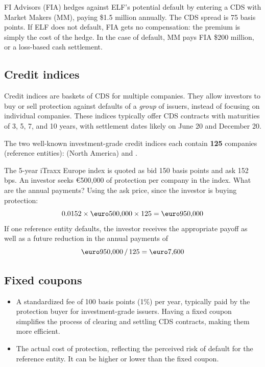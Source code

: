 \begin{crexbox}
FI Advisors (FIA) hedges against ELF's potential default by entering a CDS with
Market Makers (MM), paying \$1.5 million annually. The CDS spread is 75 basis
points.
\tcblower
If ELF does not default, FIA gets no compensation: the premium is simply the cost
of the hedge. In the case of default, MM pays FIA \$200 million, or a loss-based
cash settlement.
\end{crexbox}

\subsection*{Credit indices}

Credit indices are baskets of CDS for multiple companies. They allow investors to
buy or sell protection against defaults of a \emph{group} of issuers, instead of
focusing on individual companies. These indices typically offer CDS contracts
with maturities of 3, 5, 7, and 10 years, with settlement dates likely on June 20
and December 20.

The two well-known investment-grade credit indices each contain \textbf{125}
companies (reference entities):  (North America) and
.

\begin{crexbox}
The 5-year iTraxx Europe index is quoted as bid 150 basis points and ask 152 bps.
An investor seeks \euro500,000 of protection per company in the index. What are the
annual payments?
\tcblower
Using the ask price, since the investor is buying protection:
\[ 0.0152 \times \text{\euro}500{,}000 \times 125 = \text{\euro}950{,}000 \]
If one reference entity defaults, the investor receives the appropriate payoff as
well as a future reduction in the annual payments of
\[ \text{\euro}950{,}000 \,/\, 125 = \text{\euro}7{,}600 \]
\end{crexbox}

\subsection*{Fixed coupons}

\begin{itemize}
\item {} A standardized fee of 100 basis points (1\%) per year,
typically paid by the protection buyer for investment-grade issuers. Having a
fixed coupon simplifies the process of clearing and settling CDS contracts,
making them more efficient.
\item {} The actual cost of protection, reflecting the perceived
risk of default for the reference entity. It can be higher or lower than the fixed
coupon.
\end{itemize}

